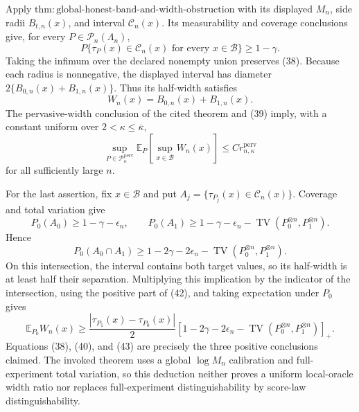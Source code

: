 Apply \(\mathrm{thm:global\text{-}honest\text{-}band\text{-}and\text{-}width\text{-}obstruction}\) with its displayed \(M_n\), side radii \(B_{t,n}(x)\), and interval \(\mathcal C_n(x)\). Its measurability and coverage conclusions give, for every \(P\in\mathcal P_n(\Lambda_n)\),
\[
P\{\tau_P(x)\in\mathcal C_n(x)\text{ for every }x\in\mathcal B\}\ge1-\gamma. \tag{38}
\]
Taking the infimum over the declared nonempty union preserves (38). Because each radius is nonnegative, the displayed interval has diameter \(2\{B_{0,n}(x)+B_{1,n}(x)\}\). Thus its half-width satisfies
\[
W_n(x)=B_{0,n}(x)+B_{1,n}(x). \tag{39}
\]
The pervasive-width conclusion of the cited theorem and (39) imply, with a constant uniform over \(2<\kappa\le\overline\kappa\),
\[
\sup_{P\in\mathcal P_{\kappa}^{\mathrm{perv}}}
\mathbb E_P\left[\sup_{x\in\mathcal B}W_n(x)\right]
\le Cr_{n,\kappa}^{\mathrm{perv}} \tag{40}
\]
for all sufficiently large \(n\).

For the last assertion, fix \(x\in\mathcal B\) and put \(A_j=\{\tau_{P_j}(x)\in\mathcal C_n(x)\}\). Coverage and total variation give
\[
P_0(A_0)\ge1-\gamma-\epsilon_n,
\qquad
P_0(A_1)\ge1-\gamma-\epsilon_n-
\operatorname{TV}(P_0^{\otimes n},P_1^{\otimes n}). \tag{41}
\]
Hence
\[
P_0(A_0\cap A_1)
\ge1-2\gamma-2\epsilon_n-
\operatorname{TV}(P_0^{\otimes n},P_1^{\otimes n}). \tag{42}
\]
On this intersection, the interval contains both target values, so its half-width is at least half their separation. Multiplying this implication by the indicator of the intersection, using the positive part of (42), and taking expectation under \(P_0\) gives
\[
\mathbb E_{P_0}W_n(x)\ge
\frac{|\tau_{P_1}(x)-\tau_{P_0}(x)|}{2}
\left[1-2\gamma-2\epsilon_n-
\operatorname{TV}(P_0^{\otimes n},P_1^{\otimes n})\right]_+. \tag{43}
\]
Equations (38), (40), and (43) are precisely the three positive conclusions claimed. The invoked theorem uses a global \(\log M_n\) calibration and full-experiment total variation, so this deduction neither proves a uniform local-oracle width ratio nor replaces full-experiment distinguishability by score-law distinguishability.